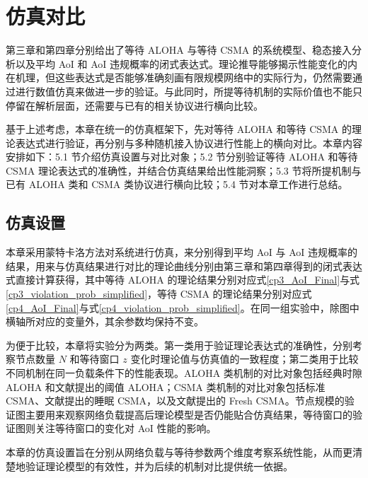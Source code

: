 \clearpage

\vspace*{-1\baselineskip}
\section{仿真对比}
\vspace{6pt}

第三章和第四章分别给出了等待 ALOHA 与等待 CSMA 的系统模型、稳态接入分析以及平均 AoI 和 AoI 违规概率的闭式表达式。理论推导能够揭示性能变化的内在机理，但这些表达式是否能够准确刻画有限规模网络中的实际行为，仍然需要通过进行数值仿真来做进一步的验证。与此同时，所提等待机制的实际价值也不能只停留在解析层面，还需要与已有的相关协议进行横向比较。

基于上述考虑，本章在统一的仿真框架下，先对等待 ALOHA 和等待 CSMA 的理论表达式进行验证，再分别与多种随机接入协议进行性能上的横向对比。本章内容安排如下：5.1 节介绍仿真设置与对比对象；5.2 节分别验证等待 ALOHA 和等待 CSMA 理论表达式的准确性，并结合仿真结果给出性能洞察；5.3 节将所提机制与已有 ALOHA 类和 CSMA 类协议进行横向比较；5.4 节对本章工作进行总结。

\subsection{仿真设置}

本章采用蒙特卡洛方法对系统进行仿真，来分别得到平均 AoI 与 AoI 违规概率的结果，用来与仿真结果进行对比的理论曲线分别由第三章和第四章得到的闭式表达式直接计算获得，其中等待 ALOHA 的理论结果分别对应式\eqref{cp3_AoI_Final}与式\eqref{cp3_violation_prob_simplified}，等待 CSMA 的理论结果分别对应式\eqref{cp4_AoI_Final}与式\eqref{cp4_violation_prob_simplified}。在同一组实验中，除图中横轴所对应的变量外，其余参数均保持不变。

为便于比较，本章将实验分为两类。第一类用于验证理论表达式的准确性，分别考察节点数量 $N$ 和等待窗口 $z$ 变化时理论值与仿真值的一致程度；第二类用于比较不同机制在同一负载条件下的性能表现。ALOHA 类机制的对比对象包括经典时隙 ALOHA 和文献提出的阈值 ALOHA；CSMA 类机制的对比对象包括标准 CSMA、文献提出的睡眠 CSMA，以及文献提出的 Fresh CSMA。节点规模的验证图主要用来观察网络负载提高后理论模型是否仍能贴合仿真结果，等待窗口的验证图则关注等待窗口的变化对 AoI 性能的影响。

本章的仿真设置旨在分别从网络负载与等待参数两个维度考察系统性能，从而更清楚地验证理论模型的有效性，并为后续的机制对比提供统一依据。

